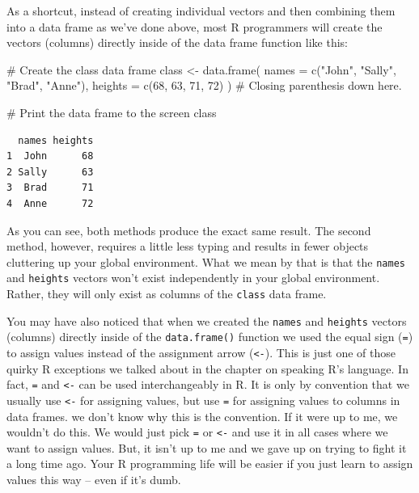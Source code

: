 \documentclass[
  letterpaper,
  DIV=11,
  numbers=noendperiod]{scrreprt}
\newenvironment{Shaded}{\begin{snugshade}}{\end{snugshade}}
\newcommand{\AttributeTok}[1]{\textcolor[rgb]{0.40,0.45,0.13}{#1}}
\newcommand{\CommentTok}[1]{\textcolor[rgb]{0.37,0.37,0.37}{#1}}
\newcommand{\DecValTok}[1]{\textcolor[rgb]{0.68,0.00,0.00}{#1}}
\newcommand{\FunctionTok}[1]{\textcolor[rgb]{0.28,0.35,0.67}{#1}}
\newcommand{\NormalTok}[1]{\textcolor[rgb]{0.00,0.23,0.31}{#1}}
\newcommand{\OtherTok}[1]{\textcolor[rgb]{0.00,0.23,0.31}{#1}}
\newcommand{\StringTok}[1]{\textcolor[rgb]{0.13,0.47,0.30}{#1}}
\begin{document}
As a shortcut, instead of creating individual vectors and then combining
them into a data frame as we've done above, most R programmers will
create the vectors (columns) directly inside of the data frame function
like this:

\begin{Shaded}
\begin{Highlighting}[]
\CommentTok{\# Create the class data frame}
\NormalTok{class }\OtherTok{\textless{}{-}} \FunctionTok{data.frame}\NormalTok{(}
  \AttributeTok{names   =} \FunctionTok{c}\NormalTok{(}\StringTok{"John"}\NormalTok{, }\StringTok{"Sally"}\NormalTok{, }\StringTok{"Brad"}\NormalTok{, }\StringTok{"Anne"}\NormalTok{),}
  \AttributeTok{heights =} \FunctionTok{c}\NormalTok{(}\DecValTok{68}\NormalTok{, }\DecValTok{63}\NormalTok{, }\DecValTok{71}\NormalTok{, }\DecValTok{72}\NormalTok{)}
\NormalTok{) }\CommentTok{\# Closing parenthesis down here.}

\CommentTok{\# Print the data frame to the screen}
\NormalTok{class}
\end{Highlighting}
\end{Shaded}

\begin{verbatim}
  names heights
1  John      68
2 Sally      63
3  Brad      71
4  Anne      72
\end{verbatim}

As you can see, both methods produce the exact same result. The second
method, however, requires a little less typing and results in fewer
objects cluttering up your global environment. What we mean by that is
that the \texttt{names} and \texttt{heights} vectors won't exist
independently in your global environment. Rather, they will only exist
as columns of the \texttt{class} data frame.

You may have also noticed that when we created the \texttt{names} and
\texttt{heights} vectors (columns) directly inside of the
\texttt{data.frame()} function we used the equal sign (\texttt{=}) to
assign values instead of the assignment arrow (\texttt{\textless{}-}).
This is just one of those quirky R exceptions we talked about in the
chapter on speaking R's language. In fact, \texttt{=} and
\texttt{\textless{}-} can be used interchangeably in R. It is only by
convention that we usually use \texttt{\textless{}-} for assigning
values, but use \texttt{=} for assigning values to columns in data
frames. we don't know why this is the convention. If it were up to me,
we wouldn't do this. We would just pick \texttt{=} or
\texttt{\textless{}-} and use it in all cases where we want to assign
values. But, it isn't up to me and we gave up on trying to fight it a
long time ago. Your R programming life will be easier if you just learn
to assign values this way -- even if it's dumb. 🤷
\end{document}
